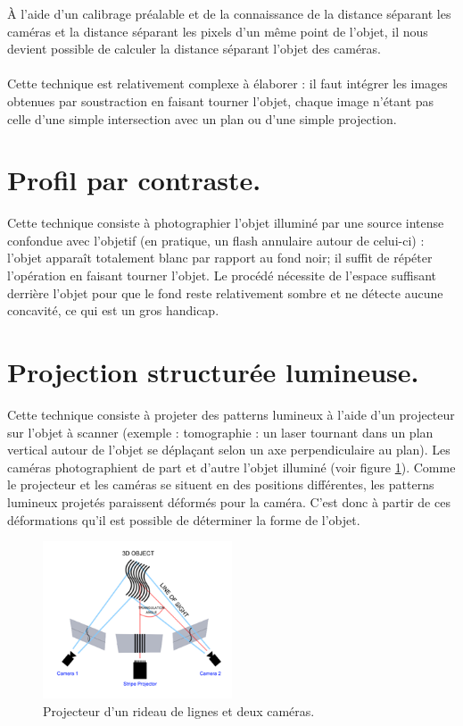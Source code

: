 \documentclass[a4paper,10pt]{report}
\begin{document}
À l’aide d’un calibrage préalable et de la connaissance de la distance séparant les caméras et la distance séparant les pixels d’un même point de l'objet, il nous devient possible de calculer la distance séparant l’objet des caméras.
\\
\\
Cette technique est relativement complexe à élaborer : il faut intégrer les images obtenues par soustraction en faisant tourner l'objet, chaque image n'étant pas celle d'une simple intersection avec un plan ou d'une simple projection.

\section{Profil par contraste.}
Cette technique consiste à photographier l'objet illuminé par une source intense confondue avec l'objetif (en pratique, un flash annulaire autour de celui-ci) : l'objet apparaît totalement blanc par rapport au fond noir; il suffit de répéter l'opération en faisant tourner l'objet. Le procédé nécessite de l'espace suffisant derrière l'objet pour que le fond reste relativement sombre et ne détecte aucune concavité, ce qui est un gros handicap.

\section{Projection structurée lumineuse.}
Cette technique consiste à projeter des patterns lumineux à l’aide d’un projecteur sur l’objet à scanner (exemple : tomographie : un laser tournant dans un plan vertical autour de l'objet se déplaçant selon un axe perpendiculaire au plan). Les caméras photographient de part et d'autre l’objet illuminé (voir figure \ref{proj_structuree}). Comme le projecteur et les caméras se situent en des positions différentes, les patterns lumineux projetés paraissent déformés pour la caméra. C’est donc à partir de ces déformations qu’il est possible de déterminer la forme de l'objet.\cite{clemson,Murale}

\begin{figure}[h!]
\centering
\includegraphics[width=0.5\textwidth]{proj_structuree.png}
\caption{Projecteur d'un rideau de lignes et deux caméras.\cite{clemson}}
\label{proj_structuree}
\end{figure}
\end{document}
